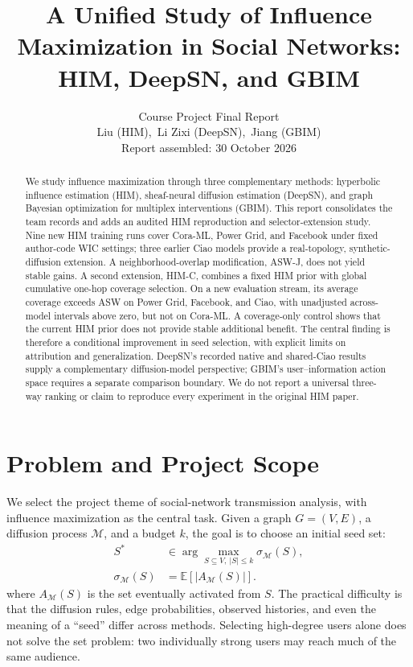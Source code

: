 \documentclass[10pt,twocolumn]{article}
\title{A Unified Study of Influence Maximization in Social Networks:\\
HIM, DeepSN, and GBIM}
\author{Course Project Final Report\\
Liu (HIM),\ Li Zixi (DeepSN),\ Jiang (GBIM)\\
Report assembled: 30 October 2026}
\date{}
\begin{document}
\maketitle

\begin{abstract}
We study influence maximization through three complementary methods: hyperbolic influence estimation (HIM), sheaf-neural diffusion estimation (DeepSN), and graph Bayesian optimization for multiplex interventions (GBIM). This report consolidates the team records and adds an audited HIM reproduction and selector-extension study. Nine new HIM training runs cover Cora-ML, Power Grid, and Facebook under fixed author-code WIC settings; three earlier Ciao models provide a real-topology, synthetic-diffusion extension. A neighborhood-overlap modification, ASW-J, does not yield stable gains. A second extension, HIM-C, combines a fixed HIM prior with global cumulative one-hop coverage selection. On a new evaluation stream, its average coverage exceeds ASW on Power Grid, Facebook, and Ciao, with unadjusted across-model intervals above zero, but not on Cora-ML. A coverage-only control shows that the current HIM prior does not provide stable additional benefit. The central finding is therefore a conditional improvement in seed selection, with explicit limits on attribution and generalization. DeepSN's recorded native and shared-Ciao results supply a complementary diffusion-model perspective; GBIM's user--information action space requires a separate comparison boundary. We do not report a universal three-way ranking or claim to reproduce every experiment in the original HIM paper.
\end{abstract}

\section{Problem and Project Scope}
We select the project theme of social-network transmission analysis, with influence maximization as the central task. Given a graph $G=(V,E)$, a diffusion process $\mathcal{M}$, and a budget $k$, the goal is to choose an initial seed set:
\begin{equation}
\begin{aligned}
S^*&\in\arg\max_{S\subseteq V,\ |S|\leq k}\sigma_{\mathcal M}(S),\\
\sigma_{\mathcal M}(S)&=\mathbb E[|A_{\mathcal M}(S)|].
\end{aligned}
\end{equation}
where $A_{\mathcal{M}}(S)$ is the set eventually activated from $S$. The practical difficulty is that the diffusion rules, edge probabilities, observed histories, and even the meaning of a ``seed'' differ across methods. Selecting high-degree users alone does not solve the set problem: two individually strong users may reach much of the same audience.
\end{document}
